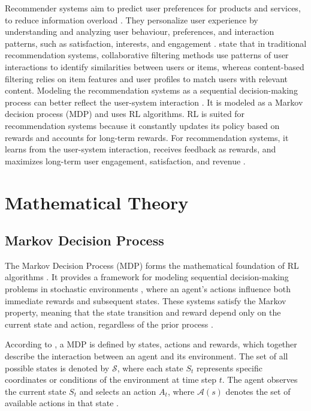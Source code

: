 \documentclass[
  authoryear,
  preprint]{elsarticle}
\begin{document}
Recommender systems aim to predict user preferences for products and
services, to reduce information overload \citep{Li2019}. They
personalize user experience by understanding and analyzing user
behaviour, preferences, and interaction patterns, such as satisfaction,
interests, and engagement \citep{Li2019}. \citet{Afsar2022} state that
in traditional recommendation systems, collaborative filtering methods
use patterns of user interactions to identify similarities between users
or items, whereas content-based filtering relies on item features and
user profiles to match users with relevant content. Modeling the
recommendation systems as a sequential decision-making process can
better reflect the user-system interaction \citep{Afsar2022}. It is
modeled as a Markov decision process (MDP) and uses RL algorithms. RL is
suited for recommendation systems because it constantly updates its
policy based on rewards and accounts for long-term rewards. For
recommendation systems, it learns from the user-system interaction,
receives feedback as rewards, and maximizes long-term user engagement,
satisfaction, and revenue \citep{Afsar2022}.

\section{Mathematical Theory}\label{mathematical-theory}

\subsection{Markov Decision Process}\label{markov-decision-process}

The Markov Decision Process (MDP) forms the mathematical foundation of
RL algorithms \citep{SuttonBarto2020}. It provides a framework for
modeling sequential decision-making problems in stochastic environments
\citep{White1989}, where an agent's actions influence both immediate
rewards and subsequent states. These systems satisfy the Markov
property, meaning that the state transition and reward depend only on
the current state and action, regardless of the prior process
\citep{SuttonBarto2020}.

According to \citet{SuttonBarto2020}, a MDP is defined by states,
actions and rewards, which together describe the interaction between an
agent and its environment. The set of all possible states is denoted by
\(\mathcal{S}\), where each state \(S_t\) represents specific
coordinates or conditions of the environment at time step \(t\). The
agent observes the current state \(S_t\) and selects an action \(A_t\),
where \(\mathcal{A}(s)\) denotes the set of available actions in that
state \citep{SuttonBarto2020}.
\end{document}
